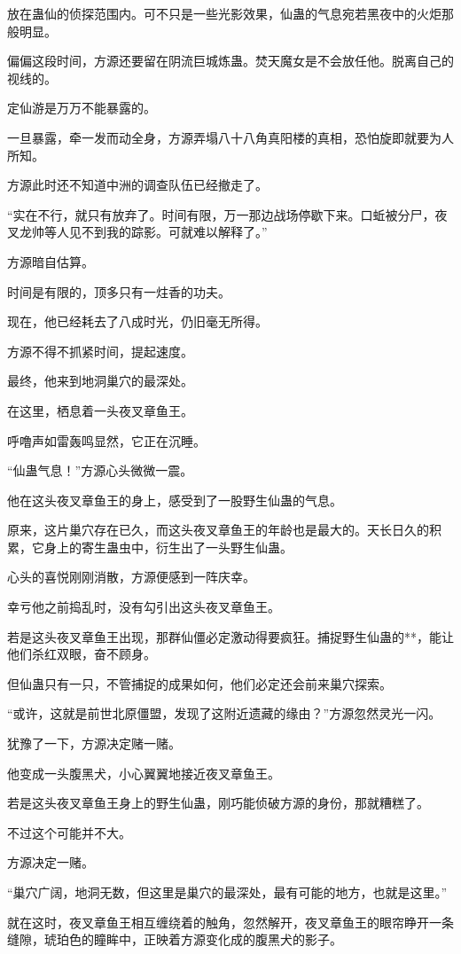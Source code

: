 \begin{this_body}
放在蛊仙的侦探范围内。可不只是一些光影效果，仙蛊的气息宛若黑夜中的火炬那般明显。

偏偏这段时间，方源还要留在阴流巨城炼蛊。焚天魔女是不会放任他。脱离自己的视线的。

定仙游是万万不能暴露的。

一旦暴露，牵一发而动全身，方源弄塌八十八角真阳楼的真相，恐怕旋即就要为人所知。

方源此时还不知道中洲的调查队伍已经撤走了。

“实在不行，就只有放弃了。时间有限，万一那边战场停歇下来。口蚯被分尸，夜叉龙帅等人见不到我的踪影。可就难以解释了。”

方源暗自估算。

时间是有限的，顶多只有一炷香的功夫。

现在，他已经耗去了八成时光，仍旧毫无所得。

方源不得不抓紧时间，提起速度。

最终，他来到地洞巢穴的最深处。

在这里，栖息着一头夜叉章鱼王。

呼噜声如雷轰鸣显然，它正在沉睡。

“仙蛊气息！”方源心头微微一震。

他在这头夜叉章鱼王的身上，感受到了一股野生仙蛊的气息。

原来，这片巢穴存在已久，而这头夜叉章鱼王的年龄也是最大的。天长日久的积累，它身上的寄生蛊虫中，衍生出了一头野生仙蛊。

心头的喜悦刚刚消散，方源便感到一阵庆幸。

幸亏他之前捣乱时，没有勾引出这头夜叉章鱼王。

若是这头夜叉章鱼王出现，那群仙僵必定激动得要疯狂。捕捉野生仙蛊的**，能让他们杀红双眼，奋不顾身。

但仙蛊只有一只，不管捕捉的成果如何，他们必定还会前来巢穴探索。

“或许，这就是前世北原僵盟，发现了这附近遗藏的缘由？”方源忽然灵光一闪。

犹豫了一下，方源决定赌一赌。

他变成一头腹黑犬，小心翼翼地接近夜叉章鱼王。

若是这头夜叉章鱼王身上的野生仙蛊，刚巧能侦破方源的身份，那就糟糕了。

不过这个可能并不大。

方源决定一赌。

“巢穴广阔，地洞无数，但这里是巢穴的最深处，最有可能的地方，也就是这里。”

就在这时，夜叉章鱼王相互缠绕着的触角，忽然解开，夜叉章鱼王的眼帘睁开一条缝隙，琥珀色的瞳眸中，正映着方源变化成的腹黑犬的影子。


\end{this_body}
